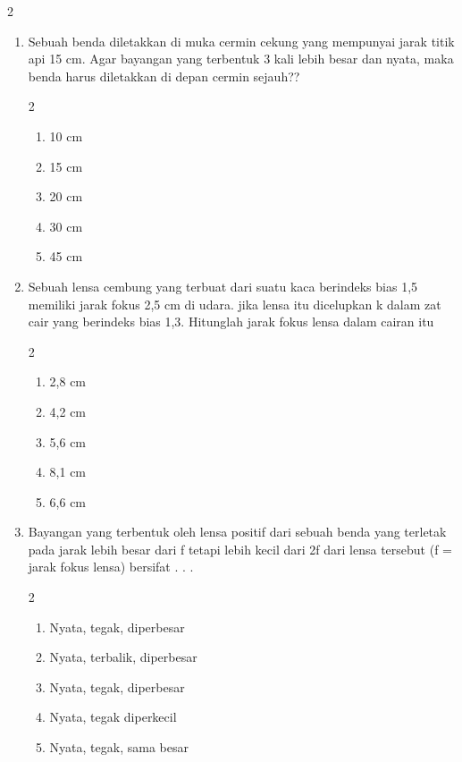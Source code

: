 \documentclass[10pt,a4paper]{extarticle}
\newcommand{\pilgani}[1]{                            \vspace{-0.3cm}\begin{multicols}{2}
 \begin{enumerate}[label=\Alph*., itemsep=0pt,topsep=0pt,leftmargin=*,align=Center]#1                     \end{enumerate}
 \phantom{ini cuma sapi, wedus, dan ayam}
 \end{multicols}}
\begin{document}
\begin{multicols*}{2}
\begin{enumerate}
\item Sebuah benda diletakkan di muka cermin cekung yang mempunyai jarak titik api 15 cm. Agar bayangan yang terbentuk 3 kali lebih besar dan nyata, maka benda harus diletakkan di depan cermin sejauh??
\pilgani{
	\item 10 cm
	\item 15 cm
	\item 20 cm
	\item 30 cm
	\item 45 cm
}
\vspace{2cm}

\item Sebuah lensa cembung yang terbuat dari suatu kaca berindeks bias 1,5 memiliki jarak fokus 2,5 cm di udara. jika lensa itu dicelupkan k dalam zat cair yang berindeks bias 1,3. Hitunglah jarak fokus lensa dalam cairan itu
\pilgani{
	\item 2,8 cm
	\item 4,2 cm
	\item 5,6 cm
	\item 8,1 cm
	\item 6,6 cm
}
\vspace{3cm}

\item Bayangan yang terbentuk oleh lensa positif dari sebuah benda yang terletak pada jarak lebih besar dari f tetapi lebih kecil dari 2f dari lensa tersebut (f = jarak fokus lensa) bersifat . . . 
\pilgani{
\item Nyata, tegak, diperbesar
\item Nyata, terbalik, diperbesar
\item Nyata, tegak, diperbesar
\item Nyata, tegak diperkecil
\item Nyata, tegak, sama besar
}
 


\end{enumerate}
\end{multicols*}
\end{document}
